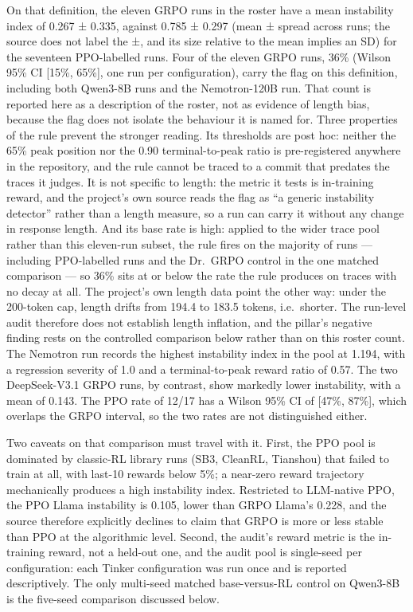 \documentclass[12pt,a4paper]{report}
\begin{document}
On that definition, the eleven GRPO runs in the roster have a mean
instability index of 0.267 ± 0.335, against 0.785 ± 0.297 (mean ± spread
across runs; the source does not label the ±, and its size relative to
the mean implies an SD) for the seventeen PPO-labelled runs. Four of the
eleven GRPO runs, 36\% (Wilson 95\% CI {[}15\%, 65\%{]}, one run per
configuration), carry the flag on this definition, including both
Qwen3-8B runs and the Nemotron-120B run. That count is reported here as
a description of the roster, not as evidence of length bias, because the
flag does not isolate the behaviour it is named for. Three properties of
the rule prevent the stronger reading. Its thresholds are post hoc:
neither the 65\% peak position nor the 0.90 terminal-to-peak ratio is
pre-registered anywhere in the repository, and the rule cannot be traced
to a commit that predates the traces it judges. It is not specific to
length: the metric it tests is in-training reward, and the project's own
source reads the flag as ``a generic instability detector'' rather than
a length measure, so a run can carry it without any change in response
length. And its base rate is high: applied to the wider trace pool
rather than this eleven-run subset, the rule fires on the majority of
runs --- including PPO-labelled runs and the Dr.~GRPO control in the one
matched comparison --- so 36\% sits at or below the rate the rule
produces on traces with no decay at all. The project's own length data
point the other way: under the 200-token cap, length drifts from 194.4
to 183.5 tokens, i.e.~shorter. The run-level audit therefore does not
establish length inflation, and the pillar's negative finding rests on
the controlled comparison below rather than on this roster count. The
Nemotron run records the highest instability index in the pool at 1.194,
with a regression severity of 1.0 and a terminal-to-peak reward ratio of
0.57. The two DeepSeek-V3.1 GRPO runs, by contrast, show markedly lower
instability, with a mean of 0.143. The PPO rate of 12/17 has a Wilson
95\% CI of {[}47\%, 87\%{]}, which overlaps the GRPO interval, so the
two rates are not distinguished either.

Two caveats on that comparison must travel with it. First, the PPO pool
is dominated by classic-RL library runs (SB3, CleanRL, Tianshou) that
failed to train at all, with last-10 rewards below 5\%; a near-zero
reward trajectory mechanically produces a high instability index.
Restricted to LLM-native PPO, the PPO Llama instability is 0.105, lower
than GRPO Llama's 0.228, and the source therefore explicitly declines to
claim that GRPO is more or less stable than PPO at the algorithmic
level. Second, the audit's reward metric is the in-training reward, not
a held-out one, and the audit pool is single-seed per configuration:
each Tinker configuration was run once and is reported descriptively.
The only multi-seed matched base-versus-RL control on Qwen3-8B is the
five-seed comparison discussed below.
\end{document}
